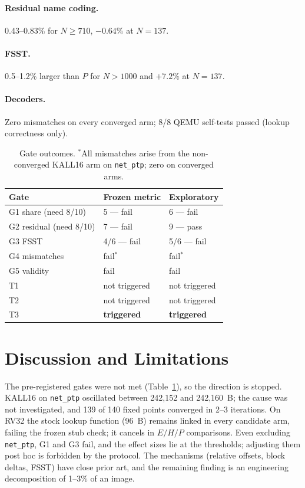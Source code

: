 \documentclass[10pt,twocolumn]{article}
\begin{document}
\paragraph{Residual name coding.} 0.43--0.83\% for $N\ge710$, $-0.64\%$ at $N=137$.
\paragraph{FSST.} 0.5--1.2\% larger than $P$ for $N>1000$ and $+7.2\%$ at $N=137$.
\paragraph{Decoders.} Zero mismatches on every converged arm; 8/8 QEMU self-tests passed (lookup correctness only).

\begin{table}[t]\centering\small
\begin{tabular}{lll}\toprule
Gate & Frozen metric & Exploratory\\\midrule
G1 share (need 8/10) & 5 --- fail & 6 --- fail\\
G2 residual (need 8/10) & 7 --- fail & 9 --- pass\\
G3 FSST & 4/6 --- fail & 5/6 --- fail\\
G4 mismatches & fail$^\ast$ & fail$^\ast$\\
G5 validity & fail & fail\\
T1 & not triggered & not triggered\\
T2 & not triggered & not triggered\\
T3 & \textbf{triggered} & \textbf{triggered}\\\bottomrule
\end{tabular}
\caption{Gate outcomes. $^\ast$All mismatches arise from the non-converged KALL16 arm on \texttt{net\_ptp}; zero on converged arms.}\label{tab:gates}
\end{table}

\section{Discussion and Limitations}\label{sec:disc}
The pre-registered gates were not met (Table~\ref{tab:gates}), so the direction is stopped. KALL16 on \texttt{net\_ptp} oscillated between 242{,}152 and 242{,}160~B; the cause was not investigated, and 139 of 140 fixed points converged in 2--3 iterations. On RV32 the stock lookup function (96~B) remains linked in every candidate arm, failing the frozen stub check; it cancels in $E/H/P$ comparisons. Even excluding \texttt{net\_ptp}, G1 and G3 fail, and the effect sizes lie at the thresholds; adjusting them post hoc is forbidden by the protocol. The mechanisms (relative offsets, block deltas, FSST) have close prior art, and the remaining finding is an engineering decomposition of 1--3\% of an image.
\end{document}
